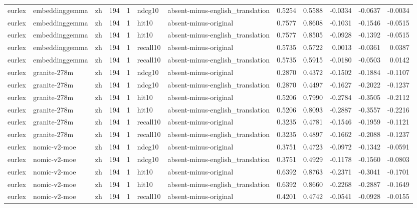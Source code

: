 \begin{tabular}{lllrrllrrrrr}
eurlex & embeddinggemma & zh & 194 & 1 & ndcg10 & absent-minus-english\_translation & 0.5254 & 0.5588 & -0.0334 & -0.0637 & -0.0034 \\
eurlex & embeddinggemma & zh & 194 & 1 & hit10 & absent-minus-original & 0.7577 & 0.8608 & -0.1031 & -0.1546 & -0.0515 \\
eurlex & embeddinggemma & zh & 194 & 1 & hit10 & absent-minus-english\_translation & 0.7577 & 0.8505 & -0.0928 & -0.1392 & -0.0515 \\
eurlex & embeddinggemma & zh & 194 & 1 & recall10 & absent-minus-original & 0.5735 & 0.5722 & 0.0013 & -0.0361 & 0.0387 \\
eurlex & embeddinggemma & zh & 194 & 1 & recall10 & absent-minus-english\_translation & 0.5735 & 0.5915 & -0.0180 & -0.0503 & 0.0142 \\
eurlex & granite-278m & zh & 194 & 1 & ndcg10 & absent-minus-original & 0.2870 & 0.4372 & -0.1502 & -0.1884 & -0.1107 \\
eurlex & granite-278m & zh & 194 & 1 & ndcg10 & absent-minus-english\_translation & 0.2870 & 0.4497 & -0.1627 & -0.2022 & -0.1237 \\
eurlex & granite-278m & zh & 194 & 1 & hit10 & absent-minus-original & 0.5206 & 0.7990 & -0.2784 & -0.3505 & -0.2112 \\
eurlex & granite-278m & zh & 194 & 1 & hit10 & absent-minus-english\_translation & 0.5206 & 0.8093 & -0.2887 & -0.3557 & -0.2216 \\
eurlex & granite-278m & zh & 194 & 1 & recall10 & absent-minus-original & 0.3235 & 0.4781 & -0.1546 & -0.1959 & -0.1121 \\
eurlex & granite-278m & zh & 194 & 1 & recall10 & absent-minus-english\_translation & 0.3235 & 0.4897 & -0.1662 & -0.2088 & -0.1237 \\
eurlex & nomic-v2-moe & zh & 194 & 1 & ndcg10 & absent-minus-original & 0.3751 & 0.4723 & -0.0972 & -0.1342 & -0.0591 \\
eurlex & nomic-v2-moe & zh & 194 & 1 & ndcg10 & absent-minus-english\_translation & 0.3751 & 0.4929 & -0.1178 & -0.1560 & -0.0803 \\
eurlex & nomic-v2-moe & zh & 194 & 1 & hit10 & absent-minus-original & 0.6392 & 0.8763 & -0.2371 & -0.3041 & -0.1701 \\
eurlex & nomic-v2-moe & zh & 194 & 1 & hit10 & absent-minus-english\_translation & 0.6392 & 0.8660 & -0.2268 & -0.2887 & -0.1649 \\
eurlex & nomic-v2-moe & zh & 194 & 1 & recall10 & absent-minus-original & 0.4201 & 0.4742 & -0.0541 & -0.0928 & -0.0155 \\

\end{tabular}
